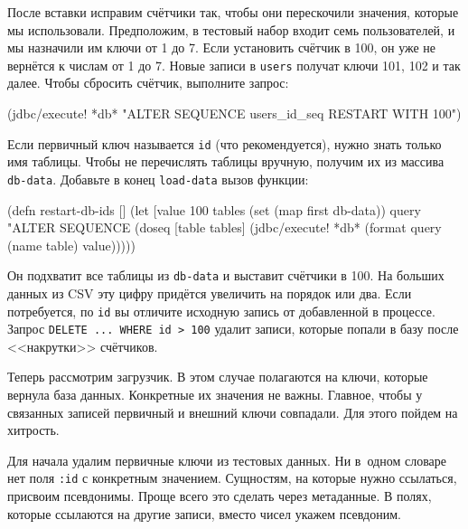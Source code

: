 
После вставки исправим счётчики так, чтобы они перескочили значения, которые мы
использовали. Предположим, в тестовый набор входит семь пользователей, и мы
назначили им ключи от 1 до 7. Если установить счётчик в 100, он уже не вернётся
к числам от 1 до 7. Новые записи в \verb|users| получат ключи 101, 102 и так
далее. Чтобы сбросить счётчик, выполните запрос:

\begin{english}
  \begin{clojure}
(jdbc/execute! *db*
  "ALTER SEQUENCE users_id_seq RESTART WITH 100")
  \end{clojure}
\end{english}

Если первичный ключ называется \verb|id| (что рекомендуется), нужно знать
только имя таблицы. Чтобы не перечислять таблицы вручную, получим их из массива
\verb|db-data|. Добавьте в конец \verb|load-data| вызов функции:


\begin{english}
  \begin{clojure}
(defn restart-db-ids []
  (let [value 100
        tables (set (map first db-data))
        query "ALTER SEQUENCE %
    (doseq [table tables]
      (jdbc/execute! *db* (format query (name table) value)))))
  \end{clojure}
\end{english}

Он подхватит все таблицы из \verb|db-data| и выставит счётчики в 100. На
больших данных из CSV эту цифру придётся увеличить на порядок или два. Если
потребуется, по \verb|id| вы отличите исходную запись от добавленной в
процессе. Запрос \verb|DELETE ... WHERE id > 100| удалит записи, которые
попали в базу после <<накрутки>> счётчиков.

Теперь рассмотрим загрузчик. В этом случае полагаются на ключи, которые вернула
база данных. Конкретные их значения не важны. Главное, чтобы у связанных записей
первичный и внешний ключи совпадали. Для этого пойдем на хитрость.


Для начала удалим первичные ключи из тестовых данных. Ни в~одном словаре нет
поля \verb|:id| с конкретным значением. Сущностям, на которые нужно ссылаться,
присвоим псевдонимы. Проще всего это сделать через метаданные. В полях, которые
ссылаются на другие записи, вместо чисел укажем псевдоним.

